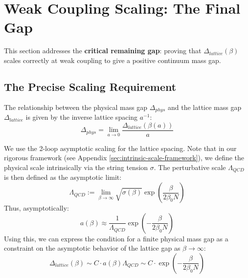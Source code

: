 \section{Weak Coupling Scaling: The Final Gap}
\label{sec:weak-coupling-scaling}

This section addresses the \textbf{critical remaining gap}: proving that 
$\Delta_{lattice}(\beta)$ scales correctly at weak coupling to give a 
positive continuum mass gap.

\subsection{The Precise Scaling Requirement}

The relationship between the physical mass gap $\Delta_{phys}$ and the lattice mass gap $\Delta_{lattice}$ is given by the inverse lattice spacing $a^{-1}$:
\begin{equation}
\Delta_{phys} = \lim_{a \to 0} \frac{\Delta_{lattice}(\beta(a))}{a}
\end{equation}

We use the 2-loop asymptotic scaling for the lattice spacing. Note that in our rigorous framework (see Appendix \ref{sec:intrinsic-scale-framework}), we define the physical scale intrinsically via the string tension $\sigma$. The perturbative scale $\Lambda_{QCD}$ is then defined as the asymptotic limit:
\begin{equation}
\Lambda_{QCD} := \lim_{\beta \to \infty} \sqrt{\sigma(\beta)} \exp\left(\frac{\beta}{2\beta_0 N}\right)
\end{equation}
Thus, asymptotically:
\begin{equation}
a(\beta) \approx \frac{1}{\Lambda_{QCD}} \exp\left(-\frac{\beta}{2\beta_0 N}\right)
\end{equation}
Using this, we can express the condition for a finite physical mass gap as a constraint on the asymptotic behavior of the lattice gap as $\beta \to \infty$:
\begin{equation}
\Delta_{lattice}(\beta) \sim C \cdot a(\beta) \Lambda_{QCD} \sim C \cdot \exp\left(-\frac{\beta}{2\beta_0 N}\right)
\end{equation}


